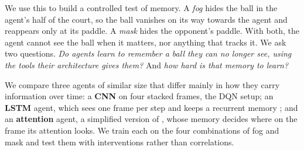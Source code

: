 \documentclass[11pt]{article}
\begin{document}
We use this to build a controlled test of memory. A \emph{fog} hides the ball in the agent's half of the
court, so the ball vanishes on its way towards the agent and reappears only at its paddle. A \emph{mask}
hides the opponent's paddle. With both, the agent cannot see the ball when it matters, nor anything that
tracks it. We ask two questions. \emph{Do agents learn to remember a ball they can no longer see, using the
tools their architecture gives them?} And \emph{how hard is that memory to learn?}

We compare three agents of similar size that differ mainly in how they carry information over time: a
\textbf{CNN} on four stacked frames, the DQN setup; an \textbf{LSTM} agent, which sees one frame per step
and keeps a recurrent memory \citep{hausknecht2015drqn}; and an \textbf{attention} agent, a simplified
version of \citet{mott2019attention}, whose memory decides where on the frame its attention looks. We
train each on the four combinations of fog and mask and test them with interventions rather than
correlations.
\end{document}
